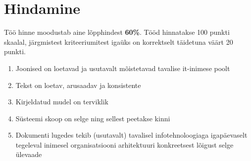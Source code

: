 \documentclass[nobib]{tufte-handout}
\begin{document}
\section{Hindamine}
Töö hinne moodustab aine lõpphindest \textbf{60\%}. Tööd hinnatakse 100 punkti skaalal,  järgmistest kriteeriumitest igaüks on korrektselt täidetuna väärt 20 punkti.
\begin{enumerate}
	\item Joonised on loetavad ja usutavalt mõistetavad tavalise it-inimese poolt
	\item Tekst on loetav, arusaadav ja konsistente
	\item Kirjeldatud mudel on terviklik
	\item Süsteemi skoop on selge ning sellest peetakse kinni
	\item Dokumenti lugedes tekib (usutavalt) tavalisel infotehnoloogiaga igapäevaselt tegeleval inimesel organisatsiooni arhitektuuri konkreetsest lõigust selge ülevaade
\end{enumerate}
\end{document}
